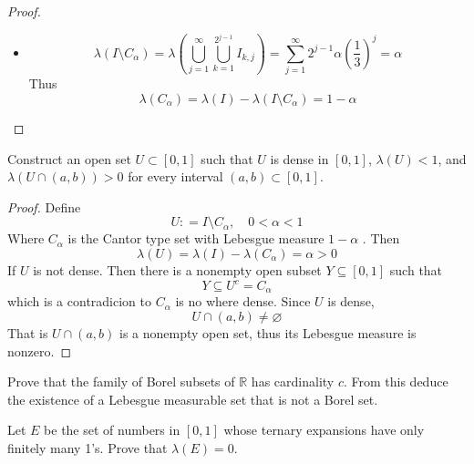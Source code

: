 \documentclass[../main.tex]{subfiles}
\begin{document}
\begin{proof}
\begin{itemize}
\[   x \in J_{i_1,\cdots ,i_{k+ 1}}
   \] Thus we have determined a unique \(  \left( i_1, i_2,\cdots \right)\in  \Sigma    \) , such that \[
   x \in \bigcap_{k = 1}^{\infty} J_{i_1,i_2,\cdots ,i_{k}} 
   \] That is \[
   f\left( i_1,i_2,\cdots  \right)= x 
   \] Thus \(  f  \) is surjective. 
   Finally, we have \[
   c= 2^{\aleph_0}= \left|  \Sigma  \right|= \left| C_{\alpha } \right|  
   \] 
      \item  \[
    \lambda \left( I\setminus C_{\alpha } \right)=  \lambda \left( \bigcup _{j = 1}^{\infty}\bigcup _{k = 1}^{2^{j-1}}I_{k,j} \right)= \sum _{j = 1}^{\infty} 2^{j-1} \alpha \left( \frac{1 }{3 }  \right)^{j}   = \alpha 
   \]Thus \[
    \lambda \left( C_{\alpha } \right)=  \lambda \left( I \right)- \lambda \left( I\setminus C_{\alpha } \right)= 1-\alpha    
   \]  
\end{itemize}
\end{proof}
\begin{exercise}{}{}
Construct an open set $U \subset [0, 1]$ such that $U$ is dense in $[0, 1]$, $\lambda(U) < 1$, and $\lambda(U \cap (a, b)) > 0$ for every interval $(a, b) \subset [0, 1]$.
\end{exercise}

\begin{proof}
   Define \[
   U: = I\setminus C_{ \alpha },\quad  0<   \alpha < 1
   \]Where \(  C_{\alpha }  \) is the Cantor type set with Lebesgue measure \(  1-\alpha   \) . Then \[
    \lambda \left( U \right)=  \lambda \left( I \right)- \lambda \left( C_{\alpha } \right)= \alpha > 0   
   \]  If \(  U  \) is not dense. Then there is a nonempty open subset \(  Y\subseteq \left[ 0,1 \right]   \) such that  \[
   Y\subseteq U^{c}= C_{\alpha }
   \] which is a contradicion to \(  C_{\alpha }  \) is no where dense.  Since \(  U  \) is dense, \[
   U\cap \left( a,b \right)\neq \varnothing 
   \] That is \(  U\cap \left( a,b \right)   \) is a nonempty open set, thus its Lebesgue measure is nonzero. 
\end{proof}
  
\begin{exercise}{}{}
    Prove that the family of Borel subsets of $\mathbb{R}$ has cardinality $c$. From this deduce the existence of a Lebesgue measurable set that is not a Borel set.

\end{exercise}
\begin{exercise}{}{}
    Let $E$ be the set of numbers in $[0, 1]$ whose ternary expansions have only finitely many 1's. Prove that $\lambda(E) = 0$.

\end{exercise}
\end{document}
